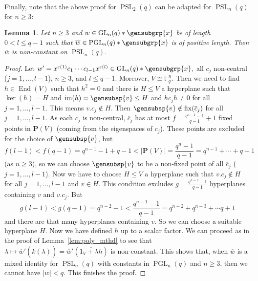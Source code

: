 \documentclass[a4paper,11pt]{amsproc}
\newcommand{\norm}[1]{\lvert#1\rvert}%
\newcommand{\card}[1]{\left\lvert#1\right\rvert}%
\newcommand{\finfield}{\mathbb{F}}%
\DeclareMathOperator{\fix}{fix}%
\DeclareMathOperator{\End}{End}%
\DeclareMathOperator{\GL}{GL}%
\DeclareMathOperator{\PSL}{PSL}%
\DeclareMathOperator{\PGL}{PGL}%
\DeclareMathOperator{\im}{im}%
\newcommand{\proj}{\mathbf P}%
\theoremstyle{plain}
\newtheorem{lemma}{Lemma}[section]
\theoremstyle{definition}
\begin{document}
	Finally, note that the above proof for $\PSL_2(q)$ can be adapted for $\PSL_n(q)$ for $n\geq 3$:
	
	\begin{lemma}\label{lem:psl_n_fnl_lem}
		Let $n\geq 3$ and $w\in\GL_n(q)\ast\gensubgrp{x}$ be of length $0<l\leq q-1$ such that $\overline{w}\in\PGL_n(q)\ast\gensubgrp{x}$ is of positive length. Then $\overline{w}$ is non-constant on $\PSL_n(q)$.
	\end{lemma}
	
	\begin{proof}
		Let           
		$
		w'=x^{\varepsilon(1)} c_1 \cdots c_{l-1} x^{\varepsilon(l)}\in\GL_n(q)\ast\gensubgrp{x},
		$ 
		all $c_j$ non-central ($j=1,\ldots,l-1$), $n\geq 3$, and $l\leq q-1$. Moreover, $V\cong \finfield_q^n$. Then we need to find $h\in\End(V)$ such that $h^2=0$ and there is $H\leq V$ a hyperplane such that $\ker(h)=H$ and $\im(h)=\gensubsp{v}\leq H$ and $hc_jh\neq 0$ for all $j=1,\ldots,l-1$. This means $v.c_j\notin H$. Then $\gensubsp{v}\notin\fix(\overline{c}_j)$ for all $j=1,\ldots,l-1$. As each $c_j$ is non-central, $\overline{c}_j$ has at most $f=\frac{q^{n-1}-1}{q-1}+1$ fixed points in $\proj(V)$ (coming from the eigenspaces of $c_j$). These points are excluded for the choice of $\gensubsp{v}$, but 
		$$
		f(l-1)<f(q-1)=q^{n-1}-1+q-1<\card{\proj(V)}=\frac{q^n-1}{q-1}=q^{n-1}+\cdots+q+1
		$$ 
		(as $n\geq 3$), so we can choose $\gensubsp{v}$ to be a non-fixed point of all $\overline{c}_j$ ($j=1,\ldots,l-1$). Now we have to choose $H\leq V$ a hyperplane such that $v.c_j\notin H$ for all $j=1,\ldots,l-1$ and $v\in H$. This condition excludes $g=\frac{q^{n-2}-1}{q-1}$ hyperplanes containing $v$ and $v.c_j$. But 
		$$
		g(l-1)<g(q-1)=q^{n-2}-1<\frac{q^{n-1}-1}{q-1}=q^{n-2}+q^{n-3}+\cdots q+1
		$$ 
		and there are that many hyperplanes containing $v$. So we can choose a suitable hyperplane $H$. Now we have defined $h$ up to a scalar factor. %
		We can proceed as in the proof of Lemma~\ref{lem:poly_mthd} to see that $\lambda\mapsto\overline{w}'(\overline{k(\lambda)})=\overline{w}'(\overline{1_V+\lambda h})$ is non-constant. This shows that, when $\overline{w}$ is a mixed identity for $\PSL_n(q)$ with constants in $\PGL_n(q)$ and $n\geq3$, then we cannot have $\norm{w}<q$. This finishes the proof.
	\end{proof}
	
\end{document}
